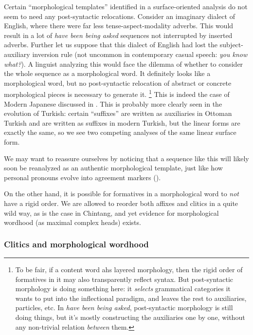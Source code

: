 \documentclass[a4paper, oneside, scheme=plain, 12pt]{article}
\newcommand{\form}[1]{\emph{#1}}
\begin{document}
Certain ``morphological templates'' identified in a surface-oriented analysis
do not seem to need any post-syntactic relocations.
Consider an imaginary dialect of English,
where there were far less tense-aspect-modality adverbs.
This would result in a lot of \form{have been being asked} sequences
not interrupted by inserted adverbs.
Further let us suppose that this dialect of English had lost the subject-auxiliary inversion rule
(not uncommon in contemporary casual speech: \form{you know what?}).
A linguist analyzing this would face the dilemma of whether to
consider the whole sequence as a morphological word.
It definitely looks like a morphological word,
but no post-syntactic relocation of abstract or concrete morphological pieces is necessary to generate it.%
\footnote{
    To be fair, if a content word ahs layered morphology,
    then the rigid order of formatives in it may also transparently reflect syntax.
    But post-syntactic morphology is doing something here:
    it \emph{selects} grammatical categories it wants to put into the inflectional paradigm,
    and leaves the rest to auxiliaries, particles, etc.
    In \form{have been being asked}, post-syntactic morphology is still doing things,
    but it's mostly constructing the auxiliaries one by one,
    without any non-trivial relation \emph{between} them.
}
This is indeed the case of Modern Japanese discussed in .
This is probably more clearly seen in the evolution of Turkish:
certain ``suffixes'' are written as auxiliaries in Ottoman Turkish
and are written as suffixes in modern Turkish,
but the linear forms are exactly the same,
so we see two competing analyses of the same linear surface form.

We may want to reassure ourselves by noticing that a sequence like this will likely soon be reanalyzed as an authentic morphological template,
just like how personal pronouns evolve into agreement markers
().

On the other hand, it is possible for formatives in a morphological word to \emph{not} have a rigid order.
We are allowed to reorder both affixes and clitics in a quite wild way, as is the case in Chintang,
and yet evidence for morphological wordhood (as maximal complex heads) exists.



\subsubsection{Clitics and morphological wordhood}\label{sec:morphological-wordhood-clitics}
\end{document}
